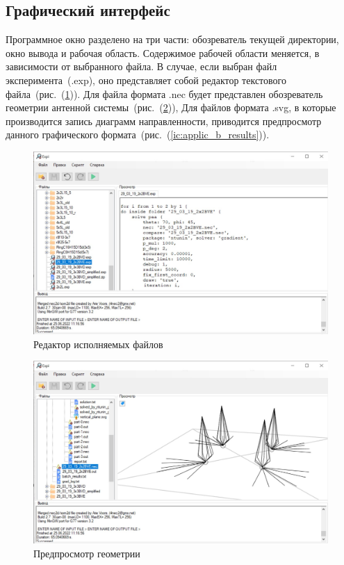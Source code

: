 \subsection{Графический интерфейс}
  Программное окно разделено на три части: обозреватель текущей директории, окно вывода и рабочая область. Содержимое рабочей области меняется, в зависимости от выбранного файла. В случае, если выбран файл эксперимента~(.exp), оно представляет собой редактор текстового файла~(рис.~(\ref{ic:applic_b_edit})). Для файла формата .nec будет представлен обозреватель геометрии антенной системы~(рис.~(\ref{ic:applic_b_preview})), Для файлов формата .svg, в которые производится запись диаграмм направленности, приводится предпросмотр данного графического формата~(рис.~(\ref{ic:applic_b_results})).

\begin{figure}[h!]
  \centering
  \includegraphics[width=\linewidth]{expi_script.jpeg}
  \caption{Редактор исполняемых файлов}
  \label{ic:applic_b_edit}
\end{figure}

\begin{figure}[h!]
  \centering
  \includegraphics[width=\linewidth]{expi_paa.jpeg}
  \caption{Предпросмотр геометрии}
  \label{ic:applic_b_preview}
\end{figure}

